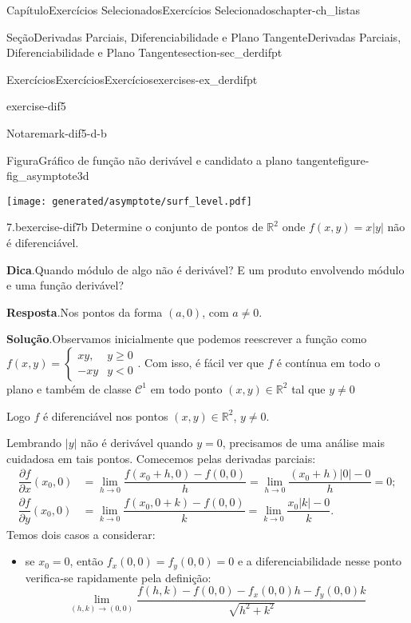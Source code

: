 \documentclass[oneside,10pt,]{book}
\newcommand{\blocktitlefont}{\relax}
\numberwithin{equation}{section}
\newcommand{\R}{\mathbb R}
\begin{document}
\begin{chapterptx}{Capítulo}{Exercícios Selecionados}{}{Exercícios Selecionados}{}{}{chapter-ch_listas}
\begin{sectionptx}{Seção}{Derivadas Parciais, Diferenciabilidade e Plano Tangente}{}{Derivadas Parciais, Diferenciabilidade e Plano Tangente}{}{}{section-sec_derdifpt}
\begin{exercises-subsection-numberless}{Exercícios}{Exercícios}{}{Exercícios}{}{}{exercises-ex_derdifpt}
\begin{divisionexercise}{5}{}{}{exercise-dif5}
\begin{remark}{Nota}{}{remark-dif5-d-b}
\begin{figureptx}{Figura}{Gráfico de função não derivável e candidato a plano tangente}{figure-fig_asymptote3d}{}
\begin{image}{0.25}{0.5}{0.25}{}%
\texttt{[image: generated/asymptote/surf\_level.pdf]}
\end{image}%
\tcblower
\end{figureptx}%
\end{remark}
\end{divisionexercise}%
\begin{divisionexercise}{7.b}{}{}{exercise-dif7b}%
Determine o conjunto de pontos de \(\R^2\) onde \(f(x,y)=x|y|\) não é diferenciável.%
\par\smallskip%
\noindent\textbf{\blocktitlefont Dica}.\hypertarget{hint-dif7b-b}{}\quad{}Quando módulo de algo não é derivável? E um produto envolvendo módulo e uma função derivável?%
\par\smallskip%
\noindent\textbf{\blocktitlefont Resposta}.\hypertarget{answer-dif7b-c}{}\quad{}Nos pontos da forma \((a,0)\), com \(a\neq 0\).%
\par\smallskip%
\noindent\textbf{\blocktitlefont Solução}.\hypertarget{solution-dif7b-d}{}\quad{}Observamos inicialmente que podemos reescrever a função como \(f(x,y)=\begin{cases} xy,& y\geq0\\ -xy& y<0
\end{cases}.\) Com isso, é fácil ver que \(f\) é contínua em todo o plano e também de classe \(\mathscr{C}^1\) em todo ponto \((x,y)\in\R^2\) tal que \(y\neq 0\)%
\par
Logo \(f\) é diferenciável nos pontos \((x,y)\in\R^2\), \(y\neq0\).%
\par
Lembrando \(|y|\) não é derivável quando \(y=0\), precisamos de uma análise mais cuidadosa em tais pontos. Comecemos pelas derivadas parciais:%
\begin{align*}
\dfrac{\partial f}{\partial x}(x_0,0)
&=\lim\limits_{h\to 0}\dfrac{f(x_0+h,0)-f(0,0)}{h}
=\lim\limits_{h\to 0}\dfrac{(x_0+h)|0|-0}{h}=0;\\
\dfrac{\partial f}{\partial y}(x_0,0)
&=\lim\limits_{k\to 0}\dfrac{f(x_0,0+k)-f(0,0)}{k}
=\lim\limits_{k\to 0}\dfrac{x_0|k|-0}{k}.
\end{align*}
Temos dois casos a considerar:%
\begin{itemize}[label=\textbullet]
\item{}se \(x_0=0\), então \(f_x(0,0)=f_y(0,0)=0\) e a diferenciabilidade nesse ponto verifica-se rapidamente pela definição:%
\begin{equation*}
\lim\limits_{(h,k)\to(0,0)}
\dfrac{f(h,k)-f(0,0)-f_x(0,0)h-f_y(0,0)k} {\sqrt{h^2+k^2}}

\end{equation*}
\end{itemize}
\end{divisionexercise}
\end{exercises-subsection-numberless}
\end{sectionptx}
\end{chapterptx}
\end{document}
